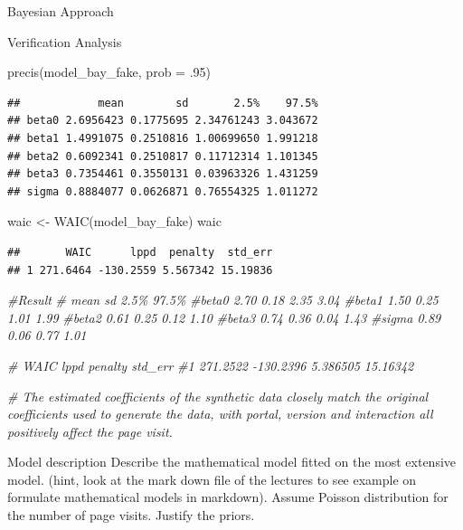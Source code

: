 \documentclass[
  ignorenonframetext,
]{beamer}
\newenvironment{Shaded}{\begin{snugshade}}{\end{snugshade}}
\newcommand{\AttributeTok}[1]{\textcolor[rgb]{0.77,0.63,0.00}{#1}}
\newcommand{\CommentTok}[1]{\textcolor[rgb]{0.56,0.35,0.01}{\textit{#1}}}
\newcommand{\DecValTok}[1]{\textcolor[rgb]{0.00,0.00,0.81}{#1}}
\newcommand{\FunctionTok}[1]{\textcolor[rgb]{0.00,0.00,0.00}{#1}}
\newcommand{\NormalTok}[1]{#1}
\newcommand{\OtherTok}[1]{\textcolor[rgb]{0.56,0.35,0.01}{#1}}
\begin{document}
\begin{frame}[fragile]{Bayesian Approach}
\begin{block}{Verification Analysis}
\begin{Shaded}
\begin{Highlighting}[]
\FunctionTok{precis}\NormalTok{(model\_bay\_fake, }\AttributeTok{prob =}\NormalTok{ .}\DecValTok{95}\NormalTok{)}
\end{Highlighting}
\end{Shaded}

\begin{verbatim}
##            mean        sd       2.5%    97.5%
## beta0 2.6956423 0.1775695 2.34761243 3.043672
## beta1 1.4991075 0.2510816 1.00699650 1.991218
## beta2 0.6092341 0.2510817 0.11712314 1.101345
## beta3 0.7354461 0.3550131 0.03963326 1.431259
## sigma 0.8884077 0.0626871 0.76554325 1.011272
\end{verbatim}

\begin{Shaded}
\begin{Highlighting}[]
\NormalTok{waic }\OtherTok{\textless{}{-}} \FunctionTok{WAIC}\NormalTok{(model\_bay\_fake)}
\NormalTok{waic}
\end{Highlighting}
\end{Shaded}

\begin{verbatim}
##       WAIC      lppd  penalty  std_err
## 1 271.6464 -130.2559 5.567342 15.19836
\end{verbatim}

\begin{Shaded}
\begin{Highlighting}[]
\CommentTok{\#Result}
\CommentTok{\#      mean   sd 2.5\% 97.5\%}
\CommentTok{\#beta0 2.70 0.18 2.35  3.04}
\CommentTok{\#beta1 1.50 0.25 1.01  1.99}
\CommentTok{\#beta2 0.61 0.25 0.12  1.10}
\CommentTok{\#beta3 0.74 0.36 0.04  1.43}
\CommentTok{\#sigma 0.89 0.06 0.77  1.01}

\CommentTok{\#      WAIC      lppd  penalty  std\_err}
\CommentTok{\#1 271.2522 {-}130.2396 5.386505 15.16342}

\CommentTok{\# The estimated coefficients of the synthetic data closely match the original coefficients used to generate the data, with portal, version and interaction all positively affect the page visit.}
\end{Highlighting}
\end{Shaded}
\end{block}

\begin{block}{Model description}
\protect\hypertarget{model-description-1}{}
Describe the mathematical model fitted on the most extensive model.
(hint, look at the mark down file of the lectures to see example on
formulate mathematical models in markdown). Assume Poisson distribution
for the number of page visits. Justify the priors.


\end{block}
\end{frame}
\end{document}
